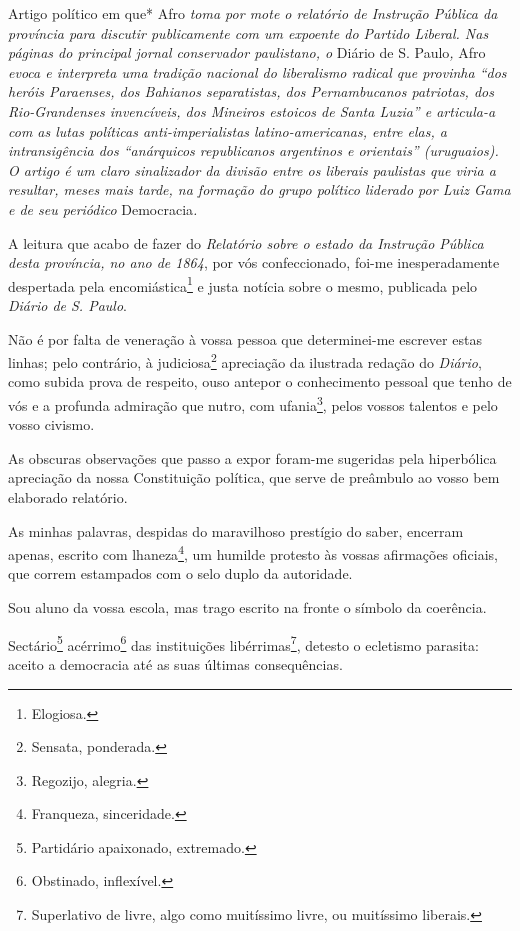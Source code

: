 \begin{didascalia}
Artigo político em que* Afro \emph{toma por mote o relatório de
Instrução Pública da província para discutir publicamente com um
expoente do Partido Liberal. Nas páginas do principal jornal conservador
paulistano, o} Diário de S. Paulo\emph{,} Afro \emph{evoca e interpreta
uma tradição nacional do liberalismo radical que provinha ``dos heróis
Paraenses, dos Bahianos separatistas, dos Pernambucanos patriotas, dos
Rio-Grandenses invencíveis, dos Mineiros estoicos de Santa Luzia'' e
articula-a com as lutas políticas anti-imperialistas latino-americanas,
entre elas, a intransigência dos ``anárquicos republicanos argentinos e
orientais'' (uruguaios). O artigo é um claro sinalizador da divisão entre
os liberais paulistas que viria a resultar, meses mais tarde, na
formação do grupo político liderado por Luiz Gama e de seu periódico}
Democracia\emph{.}
\end{didascalia}

\asterisc{}

A leitura que acabo de fazer do \emph{Relatório sobre o estado da
Instrução Pública desta província, no ano de 1864}, por vós
confeccionado, foi-me inesperadamente despertada pela
encomiástica\footnote{Elogiosa.} e justa notícia sobre o mesmo,
publicada pelo \emph{Diário de S. Paulo}.

Não é por falta de veneração à vossa pessoa que determinei-me escrever
estas linhas; pelo contrário, à judiciosa\footnote{Sensata, ponderada.}
apreciação da ilustrada redação do \emph{Diário}, como subida prova de
respeito, ouso antepor o conhecimento pessoal que tenho de vós e a
profunda admiração que nutro, com ufania\footnote{Regozijo, alegria.},
pelos vossos talentos e pelo vosso civismo.

As obscuras observações que passo a expor foram-me sugeridas pela
hiperbólica apreciação da nossa Constituição política, que serve de
preâmbulo ao vosso bem elaborado relatório.

As minhas palavras, despidas do maravilhoso prestígio do saber, encerram
apenas, escrito com lhaneza\footnote{Franqueza, sinceridade.}, um
humilde protesto às vossas afirmações oficiais, que correm estampados
com o selo duplo da autoridade.

Sou aluno da vossa escola, mas trago escrito na fronte o símbolo da
coerência.

Sectário\footnote{Partidário apaixonado, extremado.}
acérrimo\footnote{Obstinado, inflexível.} das instituições
libérrimas\footnote{Superlativo de livre, algo como muitíssimo livre,
  ou muitíssimo liberais.}, detesto o ecletismo parasita: aceito a
democracia até as suas últimas consequências.

